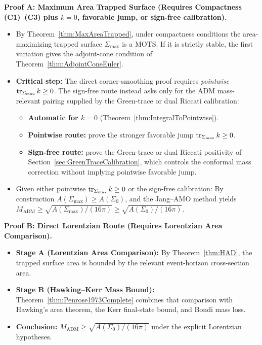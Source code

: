 \begin{theorem}
\textbf{Proof A: Maximum Area Trapped Surface (Requires Compactness (C1)--(C3) plus $k=0$, favorable jump, or sign-free calibration).}
\begin{itemize}
    \item By Theorem~\ref{thm:MaxAreaTrapped}, under compactness conditions the area-maximizing trapped surface $\Sigma_{\max}$ is a MOTS. If it is strictly stable, the first variation gives the adjoint-cone condition of Theorem~\ref{thm:AdjointConeEuler}.
    \item \textbf{Critical step:} The direct corner-smoothing proof requires \emph{pointwise} $\operatorname{tr}_{\Sigma_{\max}} k \ge 0$. The sign-free route instead asks only for the ADM mass-relevant pairing supplied by the Green-trace or dual Riccati calibration:
    \begin{itemize}
        \item \textbf{Automatic for $k = 0$} (Theorem~\ref{thm:IntegralToPointwise}).
        \item \textbf{Pointwise route:} prove the stronger favorable jump $\operatorname{tr}_{\Sigma_{\max}}k\ge0$.
        \item \textbf{Sign-free route:} prove the Green-trace or dual Riccati positivity of Section~\ref{sec:GreenTraceCalibration}, which controls the conformal mass correction without implying pointwise favorable jump.
    \end{itemize}
    \item Given either pointwise $\operatorname{tr}_{\Sigma_{\max}} k \ge 0$ or the sign-free calibration: By construction $A(\Sigma_{\max}) \ge A(\Sigma_0)$, and the Jang--AMO method yields $M_{\mathrm{ADM}} \ge \sqrt{A(\Sigma_{\max})/(16\pi)} \ge \sqrt{A(\Sigma_0)/(16\pi)}$.
\end{itemize}

\textbf{Proof B: Direct Lorentzian Route (Requires Lorentzian Area Comparison).}
\begin{itemize}
    \item \textbf{Stage A (Lorentzian Area Comparison):} By Theorem~\ref{thm:HAD}, the trapped surface area is bounded by the relevant event-horizon cross-section area.
    \item \textbf{Stage B (Hawking--Kerr Mass Bound):} Theorem~\ref{thm:Penrose1973Complete} combines that comparison with Hawking's area theorem, the Kerr final-state bound, and Bondi mass loss.
    \item \textbf{Conclusion:} $M_{\mathrm{ADM}} \ge \sqrt{A(\Sigma_0)/(16\pi)}$ under the explicit Lorentzian hypotheses.
\end{itemize}
\end{theorem}

